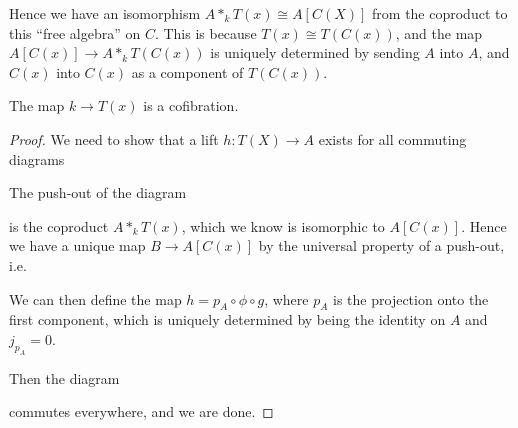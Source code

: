 Hence we have an isomorphism $A\ast_k T(x) \cong A[C(X)]$ from the coproduct to this ``free algebra'' on $C$. This is because $T(x)\cong T(C(x))$, and the map $A[C(x)]\rightarrow A\ast_k T(C(x))$ is uniquely determined by sending $A$ into $A$, and $C(x)$ into $C(x)$ as a component of $T(C(x))$. 


\begin{lemma}
The map $k\longrightarrow T(x)$ is a cofibration. 
\end{lemma}
\begin{proof}
    We need to show that a lift $h:T(X)\longrightarrow A$ exists for all commuting diagrams
\begin{center}
\end{center}
    
The push-out of the diagram 
\begin{center}
\end{center}
is the coproduct $A\ast_k T(x)$, which we know is isomorphic to $A[C(x)]$. Hence we have a unique map $B\longrightarrow A[C(x)]$ by the universal property of a push-out, i.e. 
\begin{center}
\end{center}
We can then define the map $h = p_A \circ \phi \circ g$, where $p_A$ is the projection onto the first component, which is uniquely determined by being the identity on $A$ and $j_{p_A} = 0$. 
    
Then the diagram 
\begin{center}
\end{center}
commutes everywhere, and we are done. 
\end{proof}
